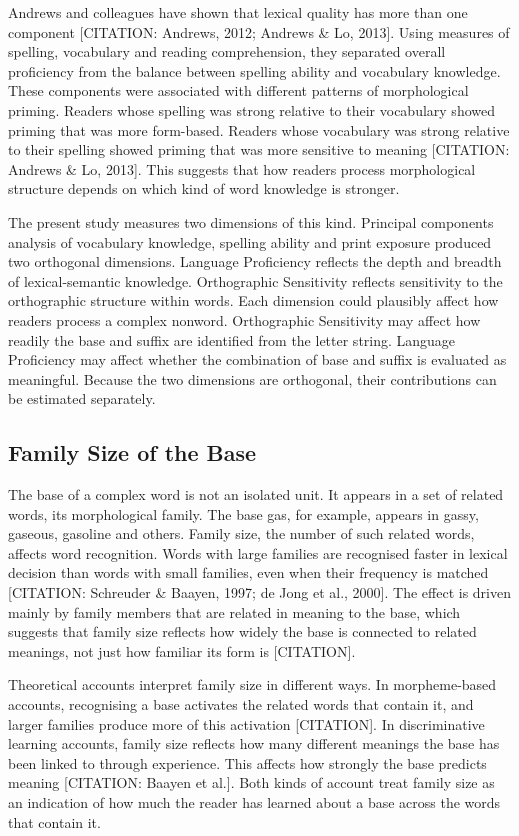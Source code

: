 \documentclass[utf8]{FrontiersinHarvard} %
\begin{document}
	Andrews and colleagues have shown that lexical quality has more than one component [CITATION: Andrews, 2012; Andrews \& Lo, 2013]. Using measures of spelling, vocabulary and reading comprehension, they separated overall proficiency from the balance between spelling ability and vocabulary knowledge. These components were associated with different patterns of morphological priming. Readers whose spelling was strong relative to their vocabulary showed priming that was more form-based. Readers whose vocabulary was strong relative to their spelling showed priming that was more sensitive to meaning [CITATION: Andrews \& Lo, 2013]. This suggests that how readers process morphological structure depends on which kind of word knowledge is stronger.
	
	The present study measures two dimensions of this kind. Principal components analysis of vocabulary knowledge, spelling ability and print exposure produced two orthogonal dimensions. Language Proficiency reflects the depth and breadth of lexical-semantic knowledge. Orthographic Sensitivity reflects sensitivity to the orthographic structure within words. Each dimension could plausibly affect how readers process a complex nonword. Orthographic Sensitivity may affect how readily the base and suffix are identified from the letter string. Language Proficiency may affect whether the combination of base and suffix is evaluated as meaningful. Because the two dimensions are orthogonal, their contributions can be estimated separately.
	
	\subsection{Family Size of the Base}
	
	The base of a complex word is not an isolated unit. It appears in a set of related words, its morphological family. The base gas, for example, appears in gassy, gaseous, gasoline and others. Family size, the number of such related words, affects word recognition. Words with large families are recognised faster in lexical decision than words with small families, even when their frequency is matched [CITATION: Schreuder \& Baayen, 1997; de Jong et al., 2000]. The effect is driven mainly by family members that are related in meaning to the base, which suggests that family size reflects how widely the base is connected to related meanings, not just how familiar its form is [CITATION].
	
	Theoretical accounts interpret family size in different ways. In morpheme-based accounts, recognising a base activates the related words that contain it, and larger families produce more of this activation [CITATION]. In discriminative learning accounts, family size reflects how many different meanings the base has been linked to through experience. This affects how strongly the base predicts meaning [CITATION: Baayen et al.]. Both kinds of account treat family size as an indication of how much the reader has learned about a base across the words that contain it.
	
\end{document}
